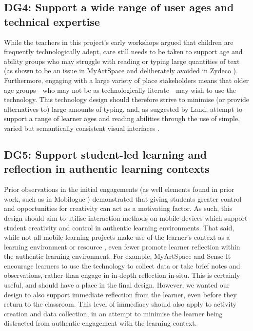 \subsection*{ DG4: Support a wide range of user ages and technical expertise }
\label{DG4}

While the teachers in this project's early workshops argued that children are frequently technologically adept, care still needs to be taken to support age and ability groups who may struggle with reading or typing large quantities of text (as shown to be an issue in MyArtSpace \citep{Vavoula2009} and deliberately avoided in Zydeco \citep{kuhn2011}). Furthermore, engaging with a large variety of place stakeholders means that older age groups---who may not be as technologically literate---may wish to use the technology. This technology design should therefore strive to minimise (or provide alternatives to) large amounts of typing, and, as suggested by Land, attempt to support a range of learner ages and reading abilities through the use of simple, varied but semantically consistent visual interfaces \citep{Land2015}.

\subsection*{ DG5: Support student-led learning and reflection in authentic learning contexts }
\label{DG5}

Prior observations in the initial engagements (as well elements found in prior work, such as in Mobilogue \citep{Giemza2013}) demonstrated that giving students greater control and opportunities for creativity can act as a motivating factor. As such, this design should aim to utilise interaction methods on mobile devices which support student creativity and control in authentic learning environments. That said, while not all mobile learning projects make use of the learner's context as a learning environment or resource \citep{Frohberg2009}, even fewer promote learner reflection within the authentic learning environment. For example, MyArtSpace \citep{Vavoula2009} and Sense-It \citep{Sharples2017} encourage learners to use the technology to collect data or take brief notes and observations, rather than engage in in-depth reflection in-situ. This is certainly useful, and should have a place in the final design. However, we wanted our design to also support immediate reflection from the learner, even before they return to the classroom. This level of immediacy should also apply to activity creation and data collection, in an attempt to minimise the learner being distracted from authentic engagement with the learning context. 

